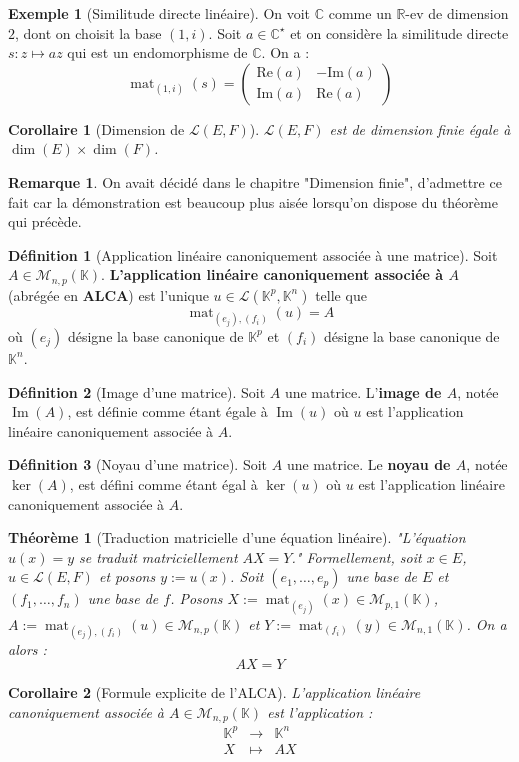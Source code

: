 \documentclass[french]{book}
\newcommand{\R}{\mathbb{R}}
\newcommand{\C}{\mathbb{C}}
\newcommand{\K}{\mathbb{K}}
\newcommand{\st}{^\star}
\theoremstyle{plain}
\newtheorem{thm}{Théorème}[chapter]
\newtheorem{cor}{Corollaire}[chapter]
\theoremstyle{definition}
\newtheorem{dfn}{Définition}[chapter]
\newtheorem{exa}{Exemple}[chapter]
\newtheorem{rmq}{Remarque}[chapter]
\theoremstyle{remark}
\DeclareMathOperator{\im}{Im}
\DeclareMathOperator{\mat}{mat}
\begin{document}
\begin{exa}[Similitude directe linéaire]
	On voit $\C$ comme un $\R$-ev de dimension $2$, dont on choisit la base $(1,i)$. Soit $a\in\C\st$ et on considère la similitude directe $s:z\mapsto az$ qui est un endomorphisme de $\C$. On a : $$\mat_{(1,i)}(s)=\begin{pmatrix}\text{Re}(a)&-\text{Im}(a)\\ \text{Im}(a)&\text{Re}(a)\end{pmatrix}$$
\end{exa}
\begin{cor}[Dimension de $\mathcal{L}(E,F)$]
	$\mathcal{L}(E,F)$ est de dimension finie égale à $\dim(E)\times\dim(F)$.
\end{cor}
\begin{rmq}
	On avait décidé dans le chapitre "Dimension finie", d'admettre ce fait car la démonstration est beaucoup plus aisée lorsqu'on dispose du théorème qui précède.
\end{rmq}
\begin{dfn}[Application linéaire canoniquement associée à une matrice]
	Soit $A\in\mathcal{M}_{n,p}(\K)$. \textbf{L'application linéaire canoniquement associée à $A$} (abrégée en \textbf{ALCA}) est l'unique $u\in\mathcal{L}(\K^p,\K^n)$ telle que $$\mat_{(e_j),(f_i)}(u)=A$$ où $(e_j)$ désigne la base canonique de $\K^p$ et $(f_i)$ désigne la base canonique de $\K^n$.
\end{dfn}
\begin{dfn}[Image d'une matrice]
	Soit $A$ une matrice. L'\textbf{image de $A$}, notée $\im(A)$, est définie comme étant égale à $\im(u)$ où $u$ est l'application linéaire canoniquement associée à $A$.
\end{dfn}
\begin{dfn}[Noyau d'une matrice]
	Soit $A$ une matrice. Le \textbf{noyau de $A$}, notée $\ker(A)$, est défini comme étant égal à $\ker(u)$ où $u$ est l'application linéaire canoniquement associée à $A$.
\end{dfn}
\begin{thm}[Traduction matricielle d'une équation linéaire]
	"L'équation $u(x)=y$ se traduit matriciellement $AX=Y$." Formellement, soit $x\in E$, $u\in\mathcal{L}(E,F)$ et posons $y:=u(x)$. Soit $(e_1,\ldots,e_p)$ une base de $E$ et $(f_1,\ldots,f_n)$ une base de $f$. Posons $X:=\mat_{(e_j)}(x)\in\mathcal{M}_{p,1}(\K)$, $A:=\mat_{(e_j),(f_i)}(u)\in\mathcal{M}_{n,p}(\K)$ et $Y:=\mat_{(f_i)}(y)\in\mathcal{M}_{n,1}(\K)$. On a alors : $$AX=Y$$
\end{thm}
\begin{cor}[Formule explicite de l'ALCA]
	L'application linéaire canoniquement associée à $A\in\mathcal{M}_{n,p}(\K)$ est l'application : $$\begin{array}{ccc}\K^p&\rightarrow&\K^n\\X&\mapsto &AX\end{array}$$
\end{cor}
\end{document}
